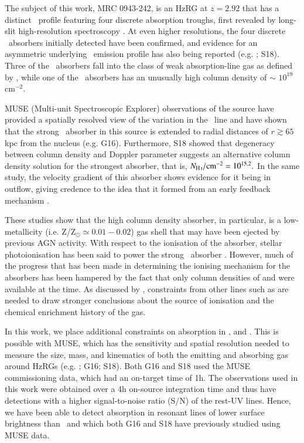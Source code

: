 The subject of this work, MRC 0943-242, is an HzRG at $z = 2.92$ that has a distinct \lya~profile featuring four discrete absorption troughs, first revealed by long-slit high-resolution spectroscopy \citep{rottgering1995}. At even higher resolutions, the four discrete \lya~absorbers initially detected have been confirmed, and evidence for an asymmetric underlying \lya~emission profile has also being reported (e.g. \citealp{jarvis2003,wilman2004}; S18). Three of the \lya~absorbers fall into the class of weak absorption-line gas as defined by \citet{wilman2004}, while one of the \lya~absorbers has an unusually high  column density of $\sim$ $10^{19}$ cm$^{-2}.$ 

MUSE (Multi-unit Spectroscopic Explorer) observations of the source have provided a spatially resolved view of the variation in the \lya~line and have shown that the strong \lya~absorber in this source is  extended to radial distances of $r \gtrsim 65$ kpc from the nucleus (e.g. G16). Furthermore, S18 showed that degeneracy between  column density and Doppler parameter suggests an alternative  column density solution for the strongest absorber, that is, $N_\ion{H}{I}/{\rm cm}^{-2} = 10^{15.2}.$ In the same study, the velocity gradient of this absorber shows evidence for it being in outflow, giving credence to the idea that it formed from an early feedback mechanism \citep{binette2000,jarvis2003}. 

These studies show that the high  column density absorber, in particular, is a low-metallicity (i.e. Z/Z$_\odot \simeq 0.01-0.02$) gas shell that may have been ejected by previous AGN activity. With respect to the ionisation of the absorber, stellar photoionisation has been said to power the strong \lya~absorber \citep{binette2006}. However, much of the progress that has been made in determining the ionising mechanism for the absorbers has been hampered by the fact that only column densities of  and  were available at the time. As discussed by \citet{binette2006}, constraints from other lines such as  are needed to draw stronger conclusions about the source of ionisation and the chemical enrichment history of the gas.

In this work, we place additional constraints on absorption in ,  and . This is possible with MUSE, which has the sensitivity and spatial resolution needed to measure the size, mass, and kinematics of both the emitting and absorbing gas around HzRGs (e.g. \citealp{swinbank2015}; G16; S18). Both G16 and S18 used the MUSE commissioning data, which had an on-target time of 1h. The observations used in this work were obtained over a 4h on-source integration time and thus have detections with a higher signal-to-noise ratio (S/N) of the rest-UV lines. Hence, we have been able to detect absorption in resonant lines of lower surface brightness than \lya~and  which both G16 and S18 have previously studied using MUSE data. 

